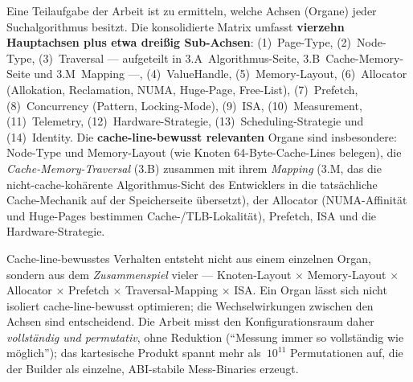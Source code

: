 Eine Teilaufgabe der Arbeit ist zu ermitteln, welche Achsen (Organe) jeder
Suchalgorithmus besitzt. Die konsolidierte Matrix umfasst \textbf{vierzehn
Hauptachsen plus etwa dreißig Sub-Achsen}: (1)~Page-Type, (2)~Node-Type,
(3)~Traversal --- aufgeteilt in 3.A~Algorithmus-Seite, 3.B~Cache-Memory-Seite
und 3.M~Mapping ---, (4)~ValueHandle, (5)~Memory-Layout, (6)~Allocator
(Allokation, Reclamation, NUMA, Huge-Page, Free-List), (7)~Prefetch,
(8)~Concurrency (Pattern, Locking-Mode), (9)~ISA, (10)~Measurement,
(11)~Telemetry, (12)~Hardware-Strategie, (13)~Scheduling-Strategie und
(14)~Identity. Die \textbf{cache-line-bewusst relevanten} Organe sind
insbesondere: Node-Type und Memory-Layout (wie Knoten 64-Byte-Cache-Lines
belegen), die \emph{Cache-Memory-Traversal} (3.B) zusammen mit ihrem
\emph{Mapping} (3.M, das die nicht-cache-kohärente Algorithmus-Sicht des
Entwicklers in die tatsächliche Cache-Mechanik auf der Speicherseite übersetzt),
der Allocator (NUMA-Affinität und Huge-Pages bestimmen Cache-/TLB-Lokalität),
Prefetch, ISA und die Hardware-Strategie.

Cache-line-bewusstes Verhalten entsteht nicht aus einem einzelnen Organ, sondern
aus dem \emph{Zusammenspiel} vieler --- Knoten-Layout $\times$ Memory-Layout
$\times$ Allocator $\times$ Prefetch $\times$ Traversal-Mapping $\times$ ISA. Ein
Organ lässt sich nicht isoliert cache-line-bewusst optimieren; die
Wechselwirkungen zwischen den Achsen sind entscheidend. Die Arbeit misst den
Konfigurationsraum daher \emph{vollständig und permutativ}, ohne Reduktion
(``Messung immer so vollständig wie möglich''); das kartesische Produkt spannt
mehr als~$10^{11}$ Permutationen auf, die der Builder als einzelne, ABI-stabile
Mess-Binaries erzeugt.

